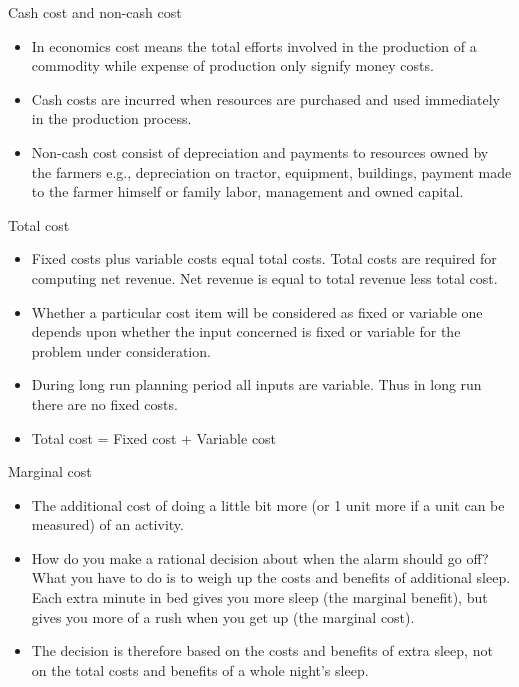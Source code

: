 \documentclass[12pt,ignorenonframetext,aspectratio=169]{beamer}
\providecommand{\tightlist}{%
  \setlength{\itemsep}{0pt}\setlength{\parskip}{0pt}}
\begin{document}
\begin{frame}{Cash cost and non-cash cost}
\protect\hypertarget{cash-cost-and-non-cash-cost}{}
\begin{itemize}
\tightlist
\item
  In economics cost means the total efforts involved in the production
  of a commodity while expense of production only signify money costs.
\item
  Cash costs are incurred when resources are purchased and used
  immediately in the production process.
\item
  Non-cash cost consist of depreciation and payments to resources owned
  by the farmers e.g., depreciation on tractor, equipment, buildings,
  payment made to the farmer himself or family labor, management and
  owned capital.
\end{itemize}
\end{frame}

\begin{frame}{Total cost}
\protect\hypertarget{total-cost}{}
\begin{itemize}
\tightlist
\item
  Fixed costs plus variable costs equal total costs. Total costs are
  required for computing net revenue. Net revenue is equal to total
  revenue less total cost.
\item
  Whether a particular cost item will be considered as fixed or variable
  one depends upon whether the input concerned is fixed or variable for
  the problem under consideration.
\item
  During long run planning period all inputs are variable. Thus in long
  run there are no fixed costs.
\item
  Total cost = Fixed cost + Variable cost
\end{itemize}
\end{frame}

\begin{frame}{Marginal cost}
\protect\hypertarget{marginal-cost}{}
\begin{itemize}
\tightlist
\item
  The additional cost of doing a little bit more (or 1 unit more if a
  unit can be measured) of an activity.
\item
  How do you make a rational decision about when the alarm should go
  off? What you have to do is to weigh up the costs and benefits of
  additional sleep. Each extra minute in bed gives you more sleep (the
  marginal benefit), but gives you more of a rush when you get up (the
  marginal cost).
\item
  The decision is therefore based on the costs and benefits of extra
  sleep, not on the total costs and benefits of a whole night's sleep.
\end{itemize}
\end{frame}
\end{document}
